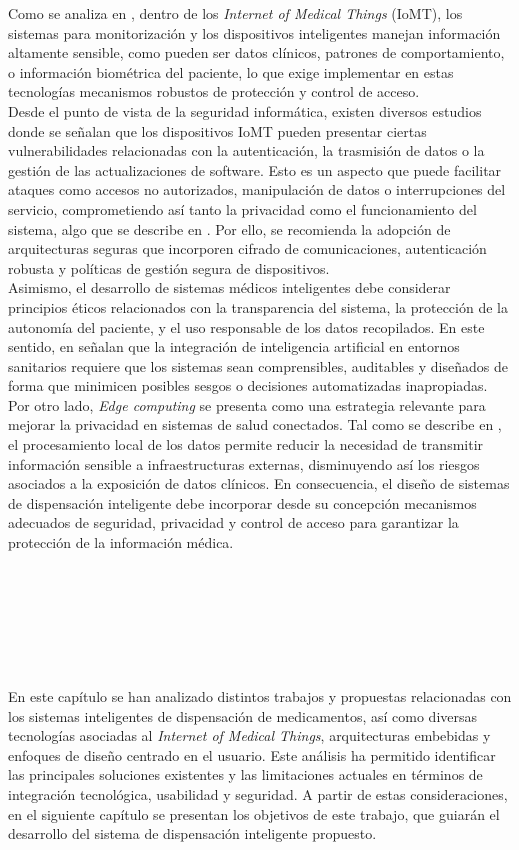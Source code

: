 Como se analiza en \cite{iot_privacy2022}, dentro de los \textit{Internet of Medical Things} (IoMT), los sistemas para monitorización y los dispositivos inteligentes manejan información altamente sensible, como pueden ser datos clínicos, patrones de comportamiento, o información biométrica del paciente, lo que exige implementar en estas tecnologías mecanismos robustos de protección y control de acceso.\\

Desde el punto de vista de la seguridad informática, existen diversos estudios donde se señalan que los dispositivos IoMT pueden presentar ciertas vulnerabilidades relacionadas con la autenticación, la trasmisión de datos o la gestión de las actualizaciones de software. Esto es un aspecto que puede facilitar ataques como accesos no autorizados, manipulación de datos o interrupciones del servicio, comprometiendo así tanto la privacidad como el funcionamiento del sistema, algo que se describe en \cite{adil2024}. Por ello, se recomienda la adopción de arquitecturas seguras que incorporen cifrado de comunicaciones, autenticación robusta y políticas de gestión segura de dispositivos.\\

Asimismo, el desarrollo de sistemas médicos inteligentes debe considerar principios éticos relacionados con la transparencia del sistema, la protección de la autonomía del paciente, y el uso responsable de los datos recopilados. En este sentido, en \cite{alsabah2025} señalan que la integración de inteligencia artificial en entornos sanitarios requiere que los sistemas sean comprensibles, auditables y diseñados de forma que minimicen posibles sesgos o decisiones automatizadas inapropiadas.\\

Por otro lado, \textit{Edge computing} se presenta como una estrategia relevante para mejorar la privacidad en sistemas de salud conectados. Tal como se describe en \cite{edgehealthcare2024}, el procesamiento local de los datos permite reducir la necesidad de transmitir información sensible a infraestructuras externas, disminuyendo así los riesgos asociados a la exposición de datos clínicos. En consecuencia, el diseño de sistemas de dispensación inteligente debe incorporar desde su concepción mecanismos adecuados de seguridad, privacidad y control de acceso para garantizar la protección de la información médica.\\

\

\

\

\

En este capítulo se han analizado distintos trabajos y propuestas relacionadas con los sistemas inteligentes de dispensación de medicamentos, así como diversas tecnologías asociadas al \textit{Internet of Medical Things}, arquitecturas embebidas y enfoques de diseño centrado en el usuario. Este análisis ha permitido identificar las principales soluciones existentes y las limitaciones actuales en términos de integración tecnológica, usabilidad y seguridad. A partir de estas consideraciones, en el siguiente capítulo se presentan los objetivos de este trabajo, que guiarán el desarrollo del sistema de dispensación inteligente propuesto.
